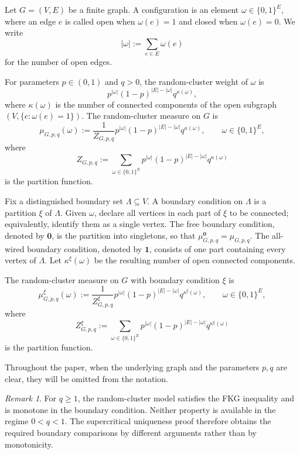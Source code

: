 \documentclass[11pt]{amsart}
\theoremstyle{plain}
\theoremstyle{definition}
\theoremstyle{remark}
\newtheorem{remark}[theorem]{Remark}
\begin{document}
Let $G=(V,E)$ be a finite graph. A configuration is an element $\omega\in\{0,1\}^E$, where an edge $e$ is called open when $\omega(e)=1$ and closed when $\omega(e)=0$. We write
\[
    |\omega|
    :=
    \sum_{e\in E}\omega(e)
\]
for the number of open edges.

For parameters $p\in(0,1)$ and $q>0$, the random-cluster weight of $\omega$ is 
\[
    p^{|\omega|}(1-p)^{|E|-|\omega|}q^{\kappa(\omega)},
\] where $\kappa(\omega)$ is the number of connected components of the open subgraph $(V,\{e:\omega(e)=1\})$. The random-cluster measure on $G$ is
\[
    \mu_{G,p,q}(\omega)
    :=
    \frac{1}{Z_{G,p,q}}
    p^{|\omega|}
    (1-p)^{|E|-|\omega|}
    q^{\kappa(\omega)},
    \qquad
    \omega\in\{0,1\}^E,
\]
where
\[
    Z_{G,p,q}
    :=
    \sum_{\omega\in\{0,1\}^E}
    p^{|\omega|}
    (1-p)^{|E|-|\omega|}
    q^{\kappa(\omega)}
\]
is the partition function.

Fix a distinguished boundary set $\Lambda\subseteq V$. A boundary condition on $\Lambda$ is a partition $\xi$ of $\Lambda$. Given $\omega$, declare all vertices in each part of $\xi$ to be connected; equivalently, identify them as a single vertex. The free boundary condition, denoted by $\mathbf 0$, is the partition into singletons, so that $\mu_{G,p,q}^{\mathbf 0}=\mu_{G,p,q}$. The all-wired boundary condition, denoted by $\mathbf 1$, consists of one part containing every vertex of $\Lambda$. Let $\kappa^\xi(\omega)$ be the resulting number of open connected components.

The random-cluster measure on $G$ with boundary condition $\xi$ is
\[
    \mu_{G,p,q}^\xi(\omega)
    :=
    \frac{1}{Z_{G,p,q}^\xi}
    p^{|\omega|}
    (1-p)^{|E|-|\omega|}
    q^{\kappa^\xi(\omega)},
    \qquad
    \omega\in\{0,1\}^E,
\]
where
\[
    Z_{G,p,q}^\xi
    :=
    \sum_{\omega\in\{0,1\}^E}
    p^{|\omega|}
    (1-p)^{|E|-|\omega|}
    q^{\kappa^\xi(\omega)}
\]
is the partition function.

Throughout the paper, when the underlying graph and the parameters $p,q$ are clear, they will be omitted from the notation.

\begin{remark}
For $q\ge1$, the random-cluster model satisfies the FKG inequality and is monotone in the boundary condition. Neither property is available in the regime $0<q<1$. The supercritical uniqueness proof therefore obtains the required boundary comparisons by different arguments rather than by monotonicity.
\end{remark}
\end{document}
